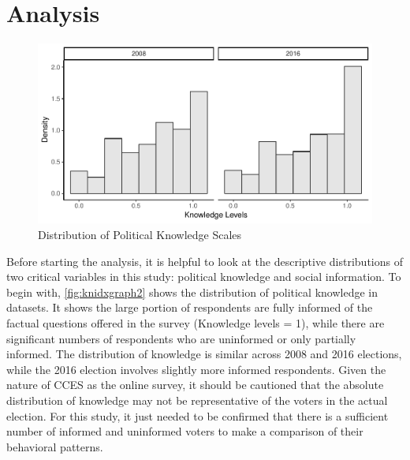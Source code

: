 \documentclass[doc,natbib,12pt]{apa6}\usepackage[]{graphicx}\usepackage[]{color}
\makeatletter
\def\maxwidth{ %
  \ifdim\Gin@nat@width>\linewidth
    \linewidth
  \else
    \Gin@nat@width
  \fi
}
\newenvironment{knitrout}{}{} %
\makeatother
\begin{document}
    
    \section{Analysis}
    
\begin{knitrout}
\color{fgcolor}\begin{figure}[t!!!]

{\centering \includegraphics[width=\maxwidth]{figure/knidxgraph2-1} 

}

\caption[Distribution of Political Knowledge Scales]{Distribution of Political Knowledge Scales}\label{fig:knidxgraph2}
\end{figure}


\end{knitrout}
    
    \par Before starting the analysis, it is helpful to look at the descriptive distributions of two critical variables in this study: political knowledge and social information. To begin with, \autoref{fig:knidxgraph2} shows the distribution of political knowledge in datasets. It shows the large portion of respondents are fully informed of the factual questions offered in the survey (Knowledge levels = 1), while there are significant numbers of respondents who are uninformed or only partially informed. The distribution of knowledge is similar across 2008 and 2016 elections, while the 2016 election involves slightly more informed respondents. Given the nature of CCES as the online survey, it should be cautioned that the absolute distribution of knowledge may not be representative of the voters in the actual election. For this study, it just needed to be confirmed that there is a sufficient number of informed and uninformed voters to make a comparison of their behavioral patterns.  
    
\end{document}
